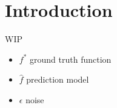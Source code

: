 \section{Introduction}

WIP
\begin{itemize}
	\item $f^*$ ground truth function
	\item $\hat{f}$ prediction model
	\item $\epsilon$ noise
\end{itemize}
